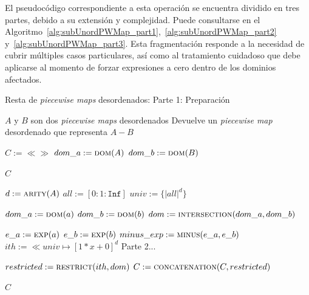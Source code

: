 El pseudocódigo correspondiente a esta operación se encuentra dividido en tres partes, debido a su extensión y complejidad. Puede consultarse en el Algoritmo~\ref{alg:subUnordPWMap_part1},~\ref{alg:subUnordPWMap_part2} y~\ref{alg:subUnordPWMap_part3}. Esta fragmentación responde a la necesidad de cubrir múltiples casos particulares, así como al tratamiento cuidadoso que debe aplicarse al momento de forzar expresiones a cero dentro de los dominios afectados.

\begin{algorithm}
\caption{Resta de \textit{piecewise maps} desordenados: Parte 1: Preparación}
\label{alg:subUnordPWMap_part1}
\begin{algorithmic}[1]
\Require $A$ y $B$ son dos \textit{piecewise maps}  desordenados
\Ensure Devuelve un \textit{piecewise map} desordenado que representa $A - B$ 

  \State $C := \ll\gg$ 
    \State $dom\_a := \Call{dom}{A}$
    \State $dom\_b := \Call{dom}{B}$ 
  
    \State \Return $C$
  \EndIf

  \State $d := \Call{arity}{A}$
  \State $all := [0:1:\texttt{Inf}]$
  \State $univ := \{|all|^d\}$

      \State $dom\_a := \Call{dom}{a}$
      \State $dom\_b := \Call{dom}{b}$
      \State $dom := \Call{intersection}{dom\_a, dom\_b}$

        \State $e\_a := \Call{exp}{a}$
        \State $e\_b := \Call{exp}{b}$
        \State $minus\_exp := \Call{minus}{e\_a, e\_b}$
        \State $ith := \ll univ \mapsto [1*x+0]^d $
        \State Parte 2...

         \State $restricted := \Call{restrict}{ith, dom}$ 
        \State $C := \Call{concatenation}{C, restricted}$
      \EndIf
    \EndFor
  \EndFor

  \State \Return $C$
\EndFunction
\end{algorithmic}
\end{algorithm}

